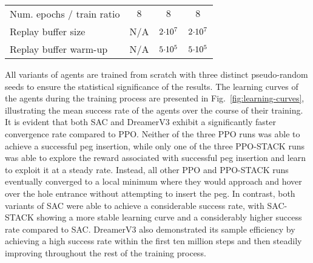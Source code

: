 \begin{table}[ht]
{\begin{tabular}{lccc}
            Num. epochs / train ratio              & \(8\)                                              & \(8\)                                              & \(8\)                                                                                          \\
            Replay buffer size                     & N/A                                                & \(2 \hspace{-0.2em}\cdot\hspace{-0.25em} 10^7\)    & \(2 \hspace{-0.2em}\cdot\hspace{-0.25em} 10^7\)                                                \\
            Replay buffer warm-up                  & N/A                                                & \(5 \hspace{-0.2em}\cdot\hspace{-0.25em} 10^5\)    & \(5 \hspace{-0.2em}\cdot\hspace{-0.25em} 10^5\)                                                \\
            \hline
        \end{tabular}
    }
\end{table}

All variants of agents are trained from scratch with three distinct pseudo-random seeds to ensure the statistical significance of the results. The learning curves of the agents during the training process are presented in Fig.~\ref{fig:learning-curves}, illustrating the mean success rate of the agents over the course of their training. It is evident that both SAC and DreamerV3 exhibit a significantly faster convergence rate compared to PPO. Neither of the three PPO runs was able to achieve a successful peg insertion, while only one of the three PPO-STACK runs was able to explore the reward associated with successful peg insertion and learn to exploit it at a steady rate. Instead, all other PPO and PPO-STACK runs eventually converged to a local minimum where they would approach and hover over the hole entrance without attempting to insert the peg. In contrast, both variants of SAC were able to achieve a considerable success rate, with SAC-STACK showing a more stable learning curve and a considerably higher success rate compared to SAC. DreamerV3 also demonstrated its sample efficiency by achieving a high success rate within the first ten million steps and then steadily improving throughout the rest of the training process.

